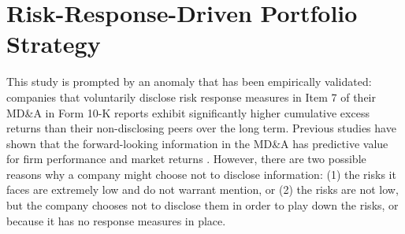\documentclass[sigconf]{acmart}
\begin{document}
\section{Risk-Response-Driven Portfolio Strategy}
\label{sec:portfolio}

This study is prompted by an anomaly that has been empirically validated: companies that voluntarily disclose risk response measures in Item 7 of their MD\&A in Form 10-K reports exhibit significantly higher cumulative excess returns than their non-disclosing peers over the long term. Previous studies have shown that the forward-looking information in the MD\&A has predictive value for firm performance and market returns \cite{li2010information, loughran2011liability}. However, there are two possible reasons why a company might choose not to disclose information: (1) the risks it faces are extremely low and do not warrant mention, or (2) the risks are not low, but the company chooses not to disclose them in order to play down the risks, or because it has no response measures in place. 
\end{document}
